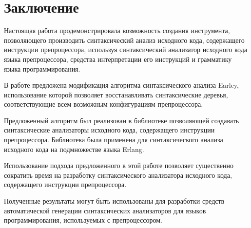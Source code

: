 \clearpage

\section{Заключение}

Настоящая работа продемонстрировала возможность создания инструмента, позволяющего производить синтаксический анализ исходного кода, содержащего инструкции препроцессора, используя синтаксический анализатор исходного кода языка препроцессора, средства интерпретации его инструкций и грамматику языка программирования.

В работе предложена модификация алгоритма синтаксического анализа Earley, использование которой позволяет восстанавливать синтаксические деревья, соответствующие всем возможным конфигурациям препроцессора.

Предложенный алгоритм был реализован в библиотеке позволяющей создавать синтаксические анализаторы исходного кода, содержащего инструкции препроцессора. Библиотека была применена для синтаксического анализа исходного кода на подмножестве языка Erlang.

Использование подхода предложенного в этой работе позволяет существенно сократить время на разработку синтаксического анализатора исходного кода, содержащего инструкции препроцессора.

Полученные результаты могут быть использованы для разработки средств автоматической генерации синтаксических анализаторов для языков программирования, используемых с препроцессором.
